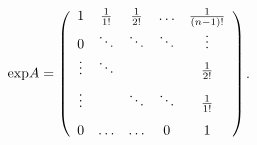 {\begin{enumerate}
{\begin{center}
$\text{exp}A=\left(
\begin{array}{ccccc}
1&\frac{1}{1!}&\frac{1}{2!}&\ldots&\frac{1}{(n-1)!}\\
0&\ddots&\ddots&\ddots&\vdots\\
\vdots&\ddots& & &\frac{1}{2!}\\
\vdots& &\ddots&\ddots&\rule[-4mm]{0mm}{11mm}\frac{1}{1!}\\
0&\ldots&\ldots&0&1
\end{array}
\right)$.
\end{center}}
\end{enumerate}
}
